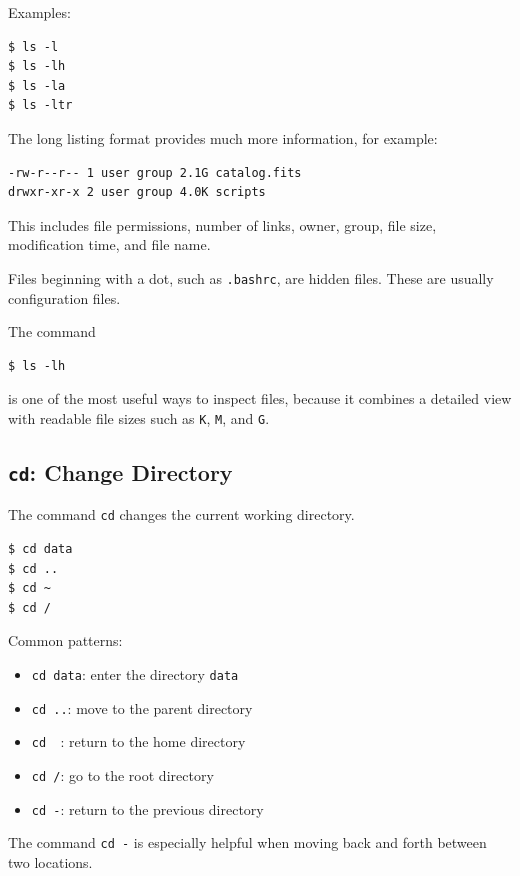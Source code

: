 Examples:

\begin{lstlisting}
$ ls -l
$ ls -lh
$ ls -la
$ ls -ltr
\end{lstlisting}

The long listing format provides much more information, for example:

\begin{lstlisting}
-rw-r--r-- 1 user group 2.1G catalog.fits
drwxr-xr-x 2 user group 4.0K scripts
\end{lstlisting}

This includes file permissions, number of links, owner, group, file size,
modification time, and file name.

Files beginning with a dot, such as \texttt{.bashrc}, are hidden files.
These are usually configuration files.

\begin{protip}
The command
\begin{lstlisting}
$ ls -lh
\end{lstlisting}
is one of the most useful ways to inspect files, because it combines a
detailed view with readable file sizes such as \texttt{K}, \texttt{M},
and \texttt{G}.
\end{protip}

\subsection{\texttt{cd}: Change Directory}

The command \texttt{cd} changes the current working directory.

\begin{lstlisting}
$ cd data
$ cd ..
$ cd ~
$ cd /
\end{lstlisting}

Common patterns:

\begin{itemize}
\item \texttt{cd data}: enter the directory \texttt{data}
\item \texttt{cd ..}: move to the parent directory
\item \texttt{cd ~}: return to the home directory
\item \texttt{cd /}: go to the root directory
\item \texttt{cd -}: return to the previous directory
\end{itemize}

The command \texttt{cd -} is especially helpful when moving back and forth
between two locations.

